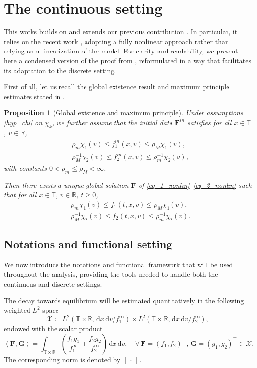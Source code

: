 \documentclass[reqno]{amsart}
\newtheorem{Proposition}{Proposition}
\newcommand{\dd}{\,\mathrm{d}}
\newcommand{\R}{\mathbb{R}}
\newcommand{\T}{\mathbb{T}}
\newcommand{\Fbf}{\mathbf{F}}
\newcommand{\Gbf}{\mathbf{G}}
\newcommand{\lla}{\left\langle}
\newcommand{\rra}{\right\rangle}
\numberwithin{equation}{section}
\begin{document}
\section{The continuous setting}\label{sec:ContinuousSetting}
This works builds on and extends our previous contribution \cite{BCLR2025}. In particular, it relies on the recent work \cite{FavrePirnerSchmeiser2023}, adopting a fully nonlinear approach rather than relying on a linearization of the model.  For clarity and readability, we present here a condensed version of the proof from \cite{FavrePirnerSchmeiser2023}, reformulated in a way that facilitates its adaptation to the discrete setting.

First of all, let us recall the global existence result and maximum principle estimates stated in \cite[Theorem 1]{FavrePirnerSchmeiser2023}.
\begin{Proposition}[Global existence and maximum principle]
    Under assumptions \eqref{hyp_chi} on $\chi_k$, we further assume that the initial data $\Fbf^{in}$ satisfies for all $x\in\T$, $v\in\R$, 
    \begin{align}
        &\rho_m\chi_1(v)\leq f_1^{in}(x,v)\leq \rho_M\chi_1(v), \label{hyp.CI.1}\\
        &\rho_M^{-1}\chi_2(v)\leq f_2^{in}(x,v)\leq \rho_m^{-1}\chi_2(v), \label{hyp.CI.2}
    \end{align}
    with constants $0<\rho_m\leq \rho_M<\infty$.
    
    Then there exists a unique global solution $\Fbf$ of \eqref{eq_1_nonlin}--\eqref{eq_2_nonlin} such that for all $x\in\T$, $v\in\R$, $t\geq 0$,
    \begin{align}
        &\rho_m\chi_1(v)\leq f_1(t,x,v)\leq \rho_M\chi_1(v), \label{estimLinf_f1}\\
        &\rho_M^{-1}\chi_2(v)\leq f_2(t,x,v)\leq \rho_m^{-1}\chi_2(v). \label{estimLinf_f2}
    \end{align}
\end{Proposition}

\subsection{Notations and functional setting} 
We now introduce the notations and functional framework that will be used throughout the analysis, providing the tools needed to handle both the continuous and discrete settings.

The decay towards equilibrium will be estimated quantitatively in the following weighted $L^2$ space
\[ \mathcal{X}\coloneq L^2(\T \times\R,\dd x\dd v/f_1^\infty)\times L^2(\T\times\R,\dd x\dd v/f_2^\infty),  \]
endowed with the scalar product
\[ \lla \Fbf,\Gbf\rra = \int_{\T\times\R} \left(\frac{f_1g_1}{f_1^\infty}+\frac{f_2g_2}{f_2^\infty}\right)\dd x \dd v,\quad\forall\, \Fbf=(f_1,f_2)^\top,\,\Gbf= (g_1,g_2)^\top\in\mathcal{X}.\]
The corresponding norm is denoted by $\|\cdot\|$.
\end{document}
